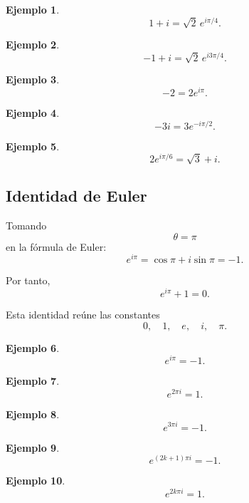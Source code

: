 \documentclass[12pt]{article}
\newtheorem{Ejem}{Ejemplo}
\begin{document}
\begin{Ejem}
\[
1+i
=
\sqrt2\,e^{i\pi/4}.
\]
\end{Ejem}


\begin{Ejem}
\[
-1+i
=
\sqrt2\,e^{i3\pi/4}.
\]

\end{Ejem}


\begin{Ejem}
\[
-2
=
2e^{i\pi}.
\]

\end{Ejem}


\begin{Ejem}
\[
-3i
=
3e^{-i\pi/2}.
\]

\end{Ejem}


\begin{Ejem}
\[
2e^{i\pi/6}
=
\sqrt3+i.
\]
\end{Ejem}


\subsection*{Identidad de Euler}

Tomando
\[
\theta=\pi
\]
en la fórmula de Euler:
\[
e^{i\pi}
=
\cos\pi+i\sin\pi
=
-1.
\]

Por tanto,
\[
\boxed{
e^{i\pi}+1=0.
}
\]

Esta identidad reúne las constantes
\[
0,\quad1,\quad e,\quad i,\quad\pi.
\]


\begin{Ejem}
\[
e^{i\pi}=-1.
\]
\end{Ejem}


\begin{Ejem}
\[
e^{2\pi i}=1.
\]

\end{Ejem}


\begin{Ejem}
\[
e^{3\pi i}=-1.
\]

\end{Ejem}


\begin{Ejem}
\[
e^{(2k+1)\pi i}=-1.
\]
\end{Ejem}


\begin{Ejem}
\[
e^{2k\pi i}=1.
\]
\end{Ejem}
\end{document}
